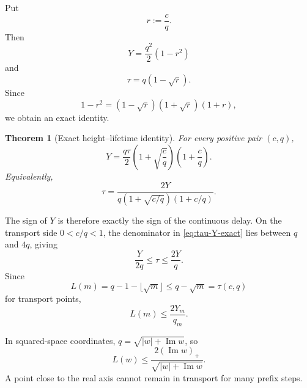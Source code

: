 \documentclass[11pt]{article}
\newtheorem{theorem}{Theorem}[section]
\theoremstyle{definition}
\theoremstyle{remark}
\newcommand{\1}{\mathbf{1}}
\newcommand{\Impart}{\operatorname{Im}}
\begin{document}
Put
\begin{equation}
 r:=\frac cq.
 \label{eq:r-ratio}
\end{equation}
Then
\begin{equation}
 Y=\frac{q^2}{2}(1-r^2)
 \label{eq:Y-r}
\end{equation}
and
\begin{equation}
 \tau=q(1-\sqrt r).
 \label{eq:tau-r}
\end{equation}
Since
\begin{equation}
 1-r^2=(1-\sqrt r)(1+\sqrt r)(1+r),
 \label{eq:factor-r}
\end{equation}
we obtain an exact identity.

\begin{theorem}[Exact height--lifetime identity]
\label{thm:exact-height-lifetime}
For every positive pair $(c,q)$,
\begin{equation}
 \boxed{
 Y
 =
 \frac{q\tau}{2}
 \left(1+\sqrt{\frac cq}\right)
 \left(1+\frac cq\right).
 }
 \label{eq:Y-tau-exact}
\end{equation}
Equivalently,
\begin{equation}
 \boxed{
 \tau
 =
 \frac{2Y}
 {q\left(1+\sqrt{c/q}\right)\left(1+c/q\right)}.
 }
 \label{eq:tau-Y-exact}
\end{equation}
\end{theorem}

The sign of $Y$ is therefore exactly the sign of the continuous delay.  On the transport side $0<c/q<1$, the denominator in \cref{eq:tau-Y-exact} lies between $q$ and $4q$, giving
\begin{equation}
 \frac{Y}{2q}
 \le\tau
 \le\frac{2Y}{q}.
 \label{eq:tau-bounds}
\end{equation}
Since
\begin{equation}
 L(m)=q-1-\lfloor\sqrt m\rfloor
 \le q-\sqrt m=\tau(c,q)
 \label{eq:L-tau}
\end{equation}
for transport points,
\begin{equation}
 \boxed{L(m)\le\frac{2Y_m}{q_m}.}
 \label{eq:L-Y}
\end{equation}

In squared-space coordinates, $q=\sqrt{|w|+\Impart w}$, so
\begin{equation}
 L(w)
 \le
 \frac{2(\Impart w)_+}
 {\sqrt{|w|+\Impart w}}.
 \label{eq:L-w}
\end{equation}
A point close to the real axis cannot remain in transport for many prefix steps.

\end{document}

